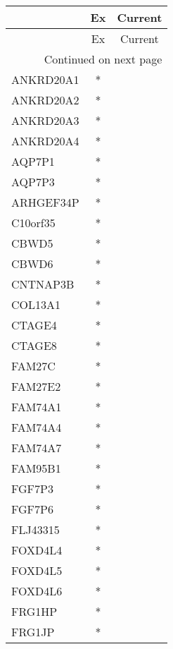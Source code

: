 \begin{longtable}{lcc}
\toprule
{} & Ex & Current \\
\midrule
\endfirsthead

\toprule
{} & Ex & Current \\
\midrule
\endhead
\midrule
\multicolumn{3}{r}{{Continued on next page}} \\
\midrule
\endfoot

\bottomrule
\endlastfoot
ANKRD20A1          &  * &         \\
ANKRD20A2          &  * &         \\
ANKRD20A3          &  * &         \\
ANKRD20A4          &  * &         \\
AQP7P1             &  * &         \\
AQP7P3             &  * &         \\
ARHGEF34P          &  * &         \\
C10orf35           &  * &         \\
CBWD5              &  * &         \\
CBWD6              &  * &         \\
CNTNAP3B           &  * &         \\
COL13A1            &  * &         \\
CTAGE4             &  * &         \\
CTAGE8             &  * &         \\
FAM27C             &  * &         \\
FAM27E2            &  * &         \\
FAM74A1            &  * &         \\
FAM74A4            &  * &         \\
FAM74A7            &  * &         \\
FAM95B1            &  * &         \\
FGF7P3             &  * &         \\
FGF7P6             &  * &         \\
FLJ43315           &  * &         \\
FOXD4L4            &  * &         \\
FOXD4L5            &  * &         \\
FOXD4L6            &  * &         \\
FRG1HP             &  * &         \\
FRG1JP             &  * &         \\

\end{longtable}
